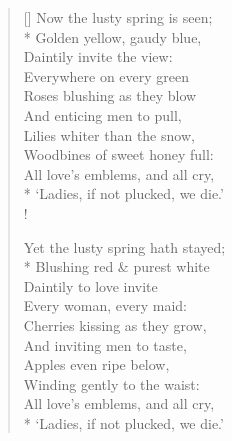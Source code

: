 \documentclass[MAIN]{subfiles}
\begin{document}
\settowidth{\versewidth}{\vin \vin All love's emblems, and all cry,}
\begin{verse}[\versewidth]
Now the lusty spring is seen;\\*
\vin Golden yellow, gaudy blue,\\
\vin Daintily invite the view:\\
Everywhere on every green\\
Roses blushing as they blow\\
\vin And enticing men to pull,\\
Lilies whiter than the snow,\\
\vin Woodbines of sweet honey full:\\
\vin \vin All love's emblems, and all cry,\\*
\vin \vin `Ladies, if not plucked, we die.'\\!

Yet the lusty spring hath stayed;\\*
\vin Blushing red \& purest white\\
\vin Daintily to love invite\\
Every woman, every maid:\\
Cherries kissing as they grow,\\
\vin And inviting men to taste,\\
Apples even ripe below,\\
\vin Winding gently to the waist:\\
\vin \vin All love's emblems, and all cry,\\*
\vin \vin `Ladies, if not plucked, we die.'
\end{verse}
\end{document}
